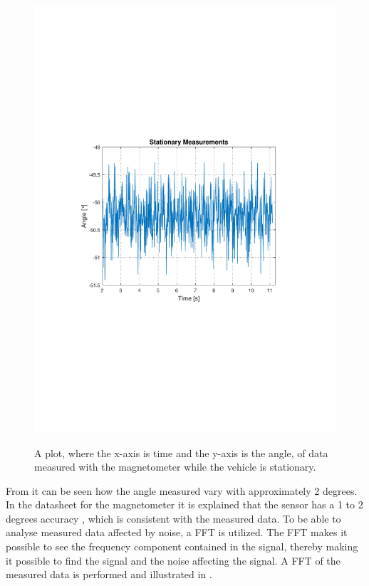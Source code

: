 \begin{figure}[H]
  \centering
  {
    \includegraphics[width=1.1\textwidth]{figures/StationaryMeasurements.pdf}
  }
  \caption{A plot, where the x-axis is time and the y-axis is the angle, of data measured with the magnetometer while the vehicle is stationary.}
  \label{fig:StationaryMeasurementsMagnato}
\end{figure}

From  it can be seen how the angle measured vary with approximately 2 degrees. In the datasheet for the magnetometer it is explained that the sensor has a 1 to 2 degrees accuracy \cite{??}, which is consistent with the measured data. To be able to analyse measured data affected by noise, a FFT is utilized. The FFT makes it possible to see the frequency component contained in the signal, thereby making it possible to find the signal and the noise affecting the signal. A FFT of the measured data is performed and illustrated in .

